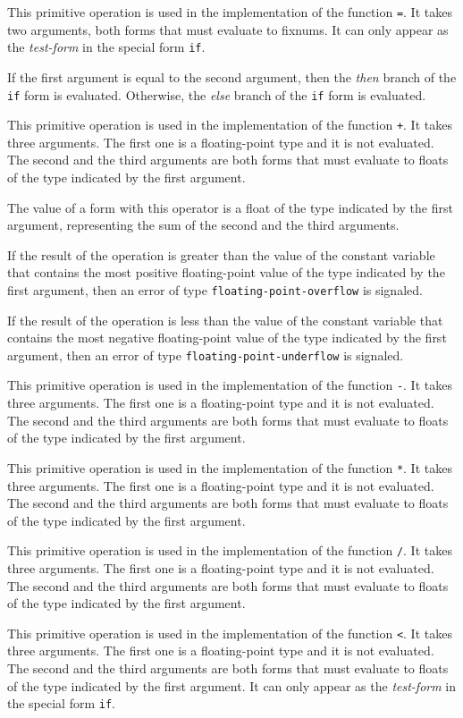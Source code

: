  {}

This primitive operation is used in the implementation of the
\commonlisp{} function \texttt{=}.  It takes two arguments, both
forms that must evaluate to fixnums.  It can only appear as the
\emph{test-form} in the special form \texttt{if}.

If the first argument is equal to the second argument,
then the \emph{then} branch of the \texttt{if} form is evaluated.
Otherwise, the \emph{else} branch of the \texttt{if} form is
evaluated.

 {}

\def\ittakesthree{It takes three arguments.  The
first one is a floating-point type and it is not evaluated.  The
second and the third arguments are both forms that must evaluate to
floats of the type indicated by the first argument.}

This primitive operation is used in the implementation of the
\commonlisp{} function \texttt{+}.  \ittakesthree{}

The value of a form with this operator is a float of the type
indicated by the first argument, representing the sum of the second
and the third arguments.

If the result of the operation is greater than the value of the
constant variable that contains the most positive floating-point value
of the type indicated by the first argument, then an error of type
\texttt{floating-point-overflow} is signaled.

If the result of the operation is less than the value of the constant
variable that contains the most negative floating-point value of the
type indicated by the first argument, then an error of type
\texttt{floating-point-underflow} is signaled.

 {}

This primitive operation is used in the implementation of the
\commonlisp{} function \texttt{-}.  \ittakesthree{}

 {}

This primitive operation is used in the implementation of the
\commonlisp{} function \texttt{*}.  \ittakesthree{}

 {}

This primitive operation is used in the implementation of the
\commonlisp{} function \texttt{/}.  \ittakesthree{}

 {}

This primitive operation is used in the implementation of the
\commonlisp{} function \texttt{<}.  \ittakesthree{}
It can only appear as the \emph{test-form} in the special form
\texttt{if}.


